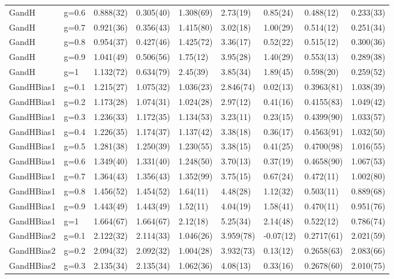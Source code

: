 \begin{table}[ht]
\begin{tabular}{lllllllll}
  GandH & g=0.6 & 0.888(32) & 0.305(40) & 1.308(69) & 2.73(19) & 0.85(24) & 0.488(12) & 0.233(33) \\ 
  GandH & g=0.7 & 0.921(36) & 0.356(43) & 1.415(80) & 3.02(18) & 1.00(29) & 0.514(12) & 0.251(34) \\ 
  GandH & g=0.8 & 0.954(37) & 0.427(46) & 1.425(72) & 3.36(17) & 0.52(22) & 0.515(12) & 0.300(36) \\ 
  GandH & g=0.9 & 1.041(49) & 0.506(56) & 1.75(12) & 3.95(28) & 1.40(29) & 0.553(13) & 0.289(38) \\ 
  GandH & g=1 & 1.132(72) & 0.634(79) & 2.45(39) & 3.85(34) & 1.89(45) & 0.598(20) & 0.259(52) \\ 
  GandHBias1 & g=0.1 & 1.215(27) & 1.075(32) & 1.036(23) & 2.846(74) & 0.02(13) & 0.3963(81) & 1.038(39) \\ 
  GandHBias1 & g=0.2 & 1.173(28) & 1.074(31) & 1.024(28) & 2.97(12) & 0.41(16) & 0.4155(83) & 1.049(42) \\ 
  GandHBias1 & g=0.3 & 1.236(33) & 1.172(35) & 1.134(53) & 3.23(11) & 0.23(15) & 0.4399(90) & 1.033(57) \\ 
  GandHBias1 & g=0.4 & 1.226(35) & 1.174(37) & 1.137(42) & 3.38(18) & 0.36(17) & 0.4563(91) & 1.032(50) \\ 
  GandHBias1 & g=0.5 & 1.281(38) & 1.250(39) & 1.230(55) & 3.38(15) & 0.41(25) & 0.4700(98) & 1.016(55) \\ 
  GandHBias1 & g=0.6 & 1.349(40) & 1.331(40) & 1.248(50) & 3.70(13) & 0.37(19) & 0.4658(90) & 1.067(53) \\ 
  GandHBias1 & g=0.7 & 1.364(43) & 1.356(43) & 1.352(99) & 3.75(15) & 0.67(24) & 0.472(11) & 1.002(80) \\ 
  GandHBias1 & g=0.8 & 1.456(52) & 1.454(52) & 1.64(11) & 4.48(28) & 1.12(32) & 0.503(11) & 0.889(68) \\ 
  GandHBias1 & g=0.9 & 1.443(49) & 1.443(49) & 1.52(11) & 4.04(19) & 1.58(41) & 0.470(11) & 0.951(76) \\ 
  GandHBias1 & g=1 & 1.664(67) & 1.664(67) & 2.12(18) & 5.25(34) & 2.14(48) & 0.522(12) & 0.786(74) \\ 
  GandHBias2 & g=0.1 & 2.122(32) & 2.114(33) & 1.046(26) & 3.959(78) & -0.07(12) & 0.2717(61) & 2.021(59) \\ 
  GandHBias2 & g=0.2 & 2.094(32) & 2.092(32) & 1.004(28) & 3.932(73) & 0.13(12) & 0.2658(63) & 2.083(66) \\ 
  GandHBias2 & g=0.3 & 2.135(34) & 2.135(34) & 1.062(36) & 4.08(13) & 0.33(16) & 0.2678(60) & 2.010(75) \\ 

\end{tabular}
\end{table}
